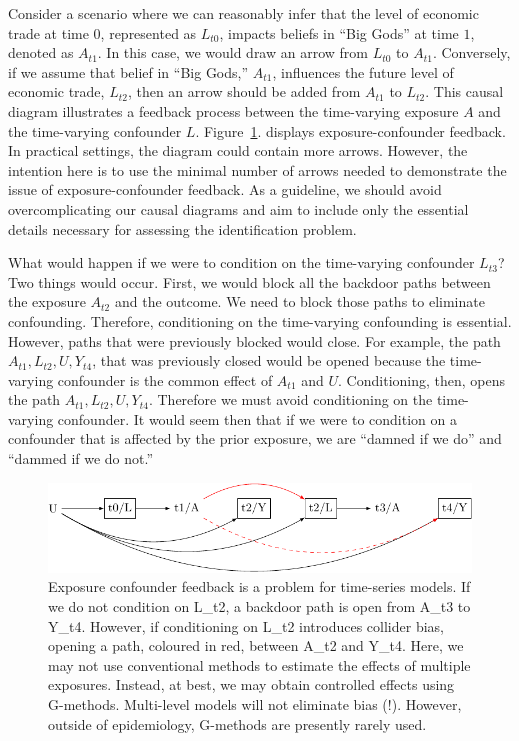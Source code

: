 \documentclass[
  singlecolumn]{article}
\begin{document}
Consider a scenario where we can reasonably infer that the level of
economic trade at time \(0\), represented as \(L_{t0}\), impacts beliefs
in ``Big Gods'' at time \(1\), denoted as \(A_{t1}\). In this case, we
would draw an arrow from \(L_{t0}\) to \(A_{t1}\). Conversely, if we
assume that belief in ``Big Gods,'' \(A_{t1}\), influences the future
level of economic trade, \(L_{t2}\), then an arrow should be added from
\(A_{t1}\) to \(L_{t2}\). This causal diagram illustrates a feedback
process between the time-varying exposure \(A\) and the time-varying
confounder \(L\). Figure~\ref{fig-dag-9}. displays exposure-confounder
feedback. In practical settings, the diagram could contain more arrows.
However, the intention here is to use the minimal number of arrows
needed to demonstrate the issue of exposure-confounder feedback. As a
guideline, we should avoid overcomplicating our causal diagrams and aim
to include only the essential details necessary for assessing the
identification problem.

What would happen if we were to condition on the time-varying confounder
\(L_{t3}\)? Two things would occur. First, we would block all the
backdoor paths between the exposure \(A_{t2}\) and the outcome. We need
to block those paths to eliminate confounding. Therefore, conditioning
on the time-varying confounding is essential. However, paths that were
previously blocked would close. For example, the path
\(A_{t1}, L_{t2}, U, Y_{t4}\), that was previously closed would be
opened because the time-varying confounder is the common effect of
\(A_{t1}\) and \(U\). Conditioning, then, opens the path
\(A_{t1}, L_{t2}, U, Y_{t4}\). Therefore we must avoid conditioning on
the time-varying confounder. It would seem then that if we were to
condition on a confounder that is affected by the prior exposure, we are
``damned if we do'' and ``dammed if we do not.''

\begin{figure}

{\centering \includegraphics[width=1\textwidth,height=\textheight]{causal-dags_files/figure-pdf/fig-dag-9-1.pdf}

}

\caption{\label{fig-dag-9}Exposure confounder feedback is a problem for
time-series models. If we do not condition on L\_t2, a backdoor path is
open from A\_t3 to Y\_t4. However, if conditioning on L\_t2 introduces
collider bias, opening a path, coloured in red, between A\_t2 and Y\_t4.
Here, we may not use conventional methods to estimate the effects of
multiple exposures. Instead, at best, we may obtain controlled effects
using G-methods. Multi-level models will not eliminate bias (!).
However, outside of epidemiology, G-methods are presently rarely used.}

\end{figure}
\end{document}
